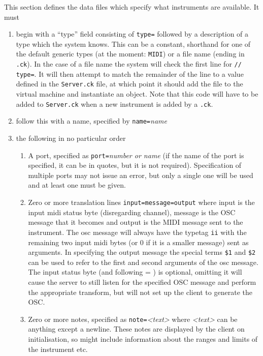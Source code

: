 \documentclass[12pt]{article}
\begin{document}
This section defines the data files which specify what instruments are available. 
It must 
\begin{enumerate} [\bfseries 1.]
\item{begin with a ``type'' field consisting of \texttt{type=} followed by a description of a type which the system knows. This can be
a constant, shorthand for one of the default generic types (at the moment: \texttt{MIDI}) or a file name (ending in \texttt{.ck}). In the case of a file name
the system will check the first line for \texttt{// type=}. It will then attempt to match the remainder of the line to a value defined in the \texttt{Server.ck}
file, at which point it should add the file to the virtual machine and instantiate an object. Note that this code will have to be added to \texttt{Server.ck}
when a new instrument is added by a \texttt{.ck}.}
\item{follow this with a name, specified by \texttt{name=}\textit{name}}
\item{the following in no particular order}
	\begin{enumerate} [\bf a.]
		\item A port, specified as \texttt{port=}\textit{number or name} (if the name of the port is specified, it can be in quotes,
			 but it is not required). Specification of multiple ports may not issue an error, but only a single one will be used and at least one must be given.
		\item Zero or more translation lines \texttt{input=message=output} where input is the input midi
			 status byte (disregarding channel), message is the OSC message that it becomes and output is the MIDI message sent to the instrument.
	 		The osc message will always have the typetag \texttt{ii} with the remaining two input midi bytes (or 0 if it is a smaller message) sent as 
	 		arguments. In specifying the output message the special terms \texttt{\$1} and \texttt{\$2} can be used to refer to the first and second arguments
			 of the osc message. The input status byte (and following = ) is optional, omitting it will cause the server to still listen for the specified OSC
			 message and perform the appropriate transform, but will not set up the client to generate the OSC.
		\item Zero or more notes, specified as \texttt{note=}\textit{<text>} where \textit{<text>} can be anything except a newline. These notes are displayed by
			the client on initialisation, so might include information about the ranges and limits of the instrument etc.
	 \end{enumerate}
\end{enumerate}
\end{document}
